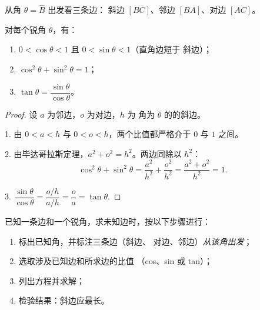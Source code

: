 \begin{omfigure}

{\small 从角 $\theta = \widehat B$ 出发看三条边：
斜边 $[BC]$、邻边 $[BA]$、对边 $[AC]$。}
\end{omfigure}

\begin{proposition}[基本性质]\label{prop:g9:trig:properties}
对每个锐角 $\theta$，有：
\begin{enumerate}
  \item $0 < \cos\theta < 1$ 且 $0 < \sin\theta < 1$（直角边短于
        斜边）；
  \item $\cos^2\theta + \sin^2\theta = 1$；
  \item $\tan\theta = \dfrac{\sin\theta}{\cos\theta}$。
\end{enumerate}
\end{proposition}

\begin{proof}
设 $a$ 为邻边，$o$ 为对边，$h$ 为
角为 $\theta$ 的的斜边。

1. 由 $0 < a < h$ 与 $0 < o < h$，两个比值都严格介于
$0$ 与 $1$ 之间。

2. 由毕达哥拉斯定理，$a^2 + o^2 = h^2$。两边同除以 $h^2$：
\[
\cos^2\theta + \sin^2\theta
= \frac{a^2}{h^2} + \frac{o^2}{h^2}
= \frac{a^2 + o^2}{h^2} = 1 .
\]

3. $\dfrac{\sin\theta}{\cos\theta} = \dfrac{o/h}{a/h} = \dfrac oa
= \tan\theta$.
\end{proof}

\begin{method}[求边长]\label{met:g9:trig:side}
已知一条边和一个锐角，求未知边时，按以下步骤进行：
\begin{enumerate}
  \item 标出已知角，并标注三条边（斜边、
        对边、邻边）\emph{从该角出发}；
  \item 选取涉及已知边和所求边的比值
        （cos、sin 或 tan）；
  \item 列出方程并求解；
  \item 检验结果：斜边应最长。
\end{enumerate}
\end{method}

